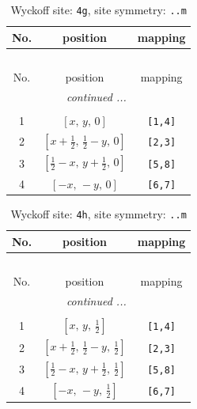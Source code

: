 \documentclass[fleqn,8pt]{jsarticle}
\begin{document}
\renewcommand{\arraystretch}{1.2}
\begin{longtable}{ccc}
\caption{Wyckoff site: {\tt 4g}, site symmetry: {\tt ..m}}
 \\
 \hline \hline
No. & position & mapping \\ \hline \endfirsthead

\multicolumn{2}{l}{\tablename\ \thetable{}} \\
 \hline \hline
No. & position & mapping \\ \hline \endhead

 \hline \hline
\multicolumn{2}{r}{\footnotesize\it continued ...} \\ \endfoot

 \hline \hline
\multicolumn{2}{r}{} \\ \endlastfoot

1 & $\left[ x,\, y,\, 0 \right]$ & {\tt [1,4]} \\ \hline
2 & $\left[ x + \frac{1}{2},\, \frac{1}{2} - y,\, 0 \right]$ & {\tt [2,3]} \\ \hline
3 & $\left[ \frac{1}{2} - x,\, y + \frac{1}{2},\, 0 \right]$ & {\tt [5,8]} \\ \hline
4 & $\left[ - x,\, - y,\, 0 \right]$ & {\tt [6,7]} \\
\end{longtable}
\renewcommand{\arraystretch}{1.2}
\begin{longtable}{ccc}
\caption{Wyckoff site: {\tt 4h}, site symmetry: {\tt ..m}}
 \\
 \hline \hline
No. & position & mapping \\ \hline \endfirsthead

\multicolumn{2}{l}{\tablename\ \thetable{}} \\
 \hline \hline
No. & position & mapping \\ \hline \endhead

 \hline \hline
\multicolumn{2}{r}{\footnotesize\it continued ...} \\ \endfoot

 \hline \hline
\multicolumn{2}{r}{} \\ \endlastfoot

1 & $\left[ x,\, y,\, \frac{1}{2} \right]$ & {\tt [1,4]} \\ \hline
2 & $\left[ x + \frac{1}{2},\, \frac{1}{2} - y,\, \frac{1}{2} \right]$ & {\tt [2,3]} \\ \hline
3 & $\left[ \frac{1}{2} - x,\, y + \frac{1}{2},\, \frac{1}{2} \right]$ & {\tt [5,8]} \\ \hline
4 & $\left[ - x,\, - y,\, \frac{1}{2} \right]$ & {\tt [6,7]} \\
\end{longtable}
\end{document}
